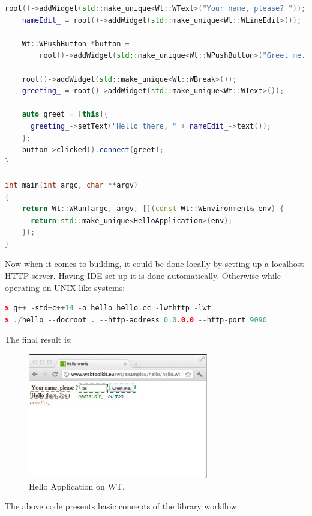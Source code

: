 \documentclass[a4paper,12pt]{article}
\begin{document}
{{\begin{lstlisting}[frame=single, basicstyle=\small, language=C++, caption={A complete "Hello world" application \cite{helloworldapp}}, captionpos=b]
    root()->addWidget(std::make_unique<Wt::WText>("Your name, please? "));
    nameEdit_ = root()->addWidget(std::make_unique<Wt::WLineEdit>());
    
    Wt::WPushButton *button = 
    	root()->addWidget(std::make_unique<Wt::WPushButton>("Greet me."));
    	
    root()->addWidget(std::make_unique<Wt::WBreak>());
    greeting_ = root()->addWidget(std::make_unique<Wt::WText>());
    
    auto greet = [this]{
      greeting_->setText("Hello there, " + nameEdit_->text());
    };
    button->clicked().connect(greet);
}

int main(int argc, char **argv)
{
    return Wt::WRun(argc, argv, [](const Wt::WEnvironment& env) {
      return std::make_unique<HelloApplication>(env);
    });
}
\end{lstlisting}

\newpage
Now when it comes to building, it could be done locally by setting up a localhost HTTP server. Having IDE set-up it is done automatically. Otherwise while operating on UNIX-like systems:

\begin{lstlisting}[frame=single, basicstyle=\small, language=C++, caption={Building "Hello world" application}, captionpos=b]
$ g++ -std=c++14 -o hello hello.cc -lwthttp -lwt
$ ./hello --docroot . --http-address 0.0.0.0 --http-port 9090
\end{lstlisting}

\bigskip
The final result is:
\begin{figure}[h]
  \centering
    \includegraphics[width=0.7\textwidth]{hello-app}
    \caption{Hello Application on WT.}
\end{figure}

\bigskip
The above code presents basic concepts of the library workflow.

}}
\end{document}
